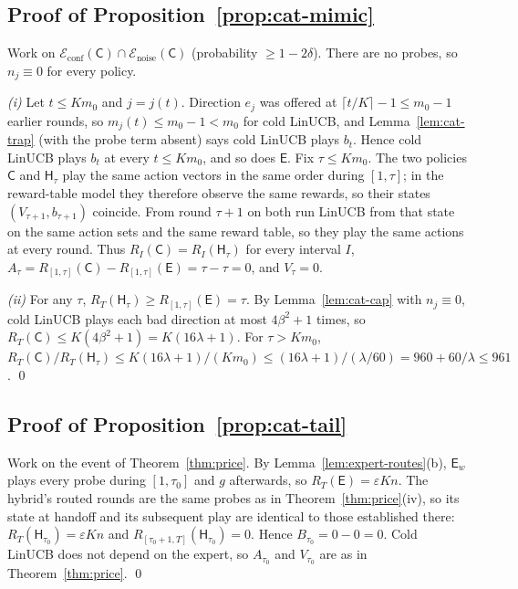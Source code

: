 \documentclass{article}
\theoremstyle{definition}
\theoremstyle{remark}
\newcommand{\eps}{\varepsilon}
\theoremstyle{remark}
\newcommand{\Cold}{\mathsf{C}}
\newcommand{\Exp}{\mathsf{E}}
\newcommand{\Hyb}{\mathsf{H}}
\begin{document}
\subsection{Proof of Proposition~\ref{prop:cat-mimic}}

Work on $\mathcal E_{\mathrm{conf}}(\Cold)\cap\mathcal E_{\mathrm{noise}}(\Cold)$
(probability $\ge1-2\delta$). There are no probes, so $n_j\equiv0$ for every
policy.

\emph{(i)} Let $t\le Km_0$ and $j=j(t)$. Direction $e_j$ was offered at
$\lceil t/K\rceil-1\le m_0-1$ earlier rounds, so $m_j(t)\le m_0-1<m_0$ for cold
LinUCB, and Lemma~\ref{lem:cat-trap} (with the probe term absent) says cold
LinUCB plays $b_t$. Hence cold LinUCB plays $b_t$ at every $t\le Km_0$, and
so does $\Exp$. Fix $\tau\le Km_0$. The two policies $\Cold$ and $\Hyb_\tau$
play the same action vectors in the same order during $[1,\tau]$; in the
reward-table model they therefore observe the same rewards, so their states
$(V_{\tau+1},b_{\tau+1})$ coincide. From round $\tau+1$ on both run LinUCB
from that state on the same action sets and the same reward table, so they
play the same actions at every round. Thus $R_I(\Cold)=R_I(\Hyb_\tau)$ for every
interval $I$, $A_\tau=R_{[1,\tau]}(\Cold)-R_{[1,\tau]}(\Exp)=\tau-\tau=0$, and $V_\tau=0$.

\emph{(ii)} For any $\tau$, $R_T(\Hyb_\tau)\ge R_{[1,\tau]}(\Exp)=\tau$. By
Lemma~\ref{lem:cat-cap} with $n_j\equiv0$, cold LinUCB plays each bad
direction at most $4\beta^2+1$ times, so $R_T(\Cold)\le K(4\beta^2+1)=K(16\lambda+1)$.
For $\tau>Km_0$, $R_T(\Cold)/R_T(\Hyb_\tau)\le K(16\lambda+1)/(Km_0)\le(16\lambda+1)/(\lambda/60)=960+60/\lambda\le961$. \qed

\subsection{Proof of Proposition~\ref{prop:cat-tail}}

Work on the event of Theorem~\ref{thm:price}. By Lemma~\ref{lem:expert-routes}(b),
$\Exp_w$ plays every probe during $[1,\tau_0]$ and $g$ afterwards, so
$R_T(\Exp)=\eps Kn$. The hybrid's routed rounds are the same probes as in
Theorem~\ref{thm:price}(iv), so its state at handoff and its subsequent play
are identical to those established there: $R_T(\Hyb_{\tau_0})=\eps Kn$ and
$R_{[\tau_0+1,T]}(\Hyb_{\tau_0})=0$. Hence $B_{\tau_0}=0-0=0$. Cold LinUCB does not
depend on the expert, so $A_{\tau_0}$ and $V_{\tau_0}$ are as in
Theorem~\ref{thm:price}. \qed
\end{document}
